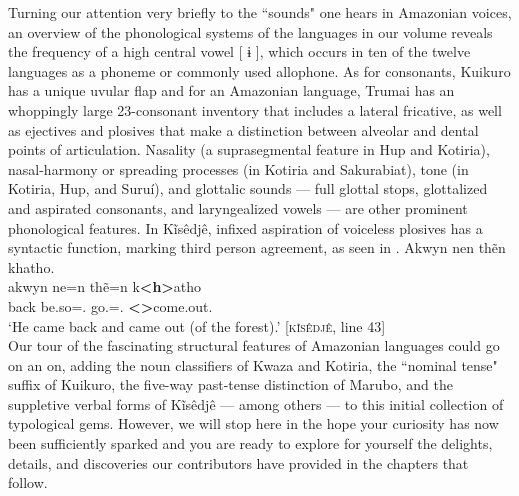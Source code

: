 \documentclass[output=paper,
modfonts,nonflat
]{langsci/langscibook}
\begin{document}
Turning our attention very briefly to the “sounds" one hears in Amazonian voices, an overview of the phonological systems of the languages in our volume reveals the frequency of a high central vowel [ ɨ ], which occurs in ten of the twelve languages as a phoneme or commonly used allophone. As for consonants, Kuikuro has a unique uvular flap and for an Amazonian language, Trumai has an whoppingly large 23-consonant inventory that includes a lateral fricative, as well as ejectives and plosives that make a distinction between alveolar and dental points of articulation. Nasality (a suprasegmental feature in Hup and Kotiria), nasal-harmony or spreading processes (in Kotiria and Sakurabiat), tone (in Kotiria, Hup, and Suruí), and glottalic sounds — full glottal stops, glottalized and aspirated consonants, and laryngealized vowels — are other prominent phonological features. In Kĩsêdjê, infixed aspiration of voiceless plosives has a syntactic function, marking third person agreement, as seen in . 
\ea\label{ex:intro:35}  Akwyn nen thẽn khatho. \\[.3em]
\gll akwyn ne=n             thẽ=n             k\textbf{<h>}atho               \\
     back  be.so=\AAnd.\Ss{} go.\Sg=\AAnd.\Ss{} \textbf{<\Third>}come.out.\Sg{} \\
\glt `He came back and came out (of the forest).' [\textsc{kĩsêdjê}, line 43]\\
\z 
Our tour of the fascinating structural features of Amazonian languages could go on an on, adding the noun classifiers of Kwaza and Kotiria, the “nominal tense" suffix of Kuikuro, the five-way past-tense distinction of Marubo, and the suppletive verbal forms of Kĩsêdjê — among others — to this initial collection of typological gems. However, we will stop here in the hope your curiosity has now been sufficiently sparked and you are ready to explore for yourself the delights, details, and discoveries our contributors have provided in the chapters that follow. 

{\sloppy
\printbibliography[heading=subbibliography,notkeyword=this]
} 
\end{document}
